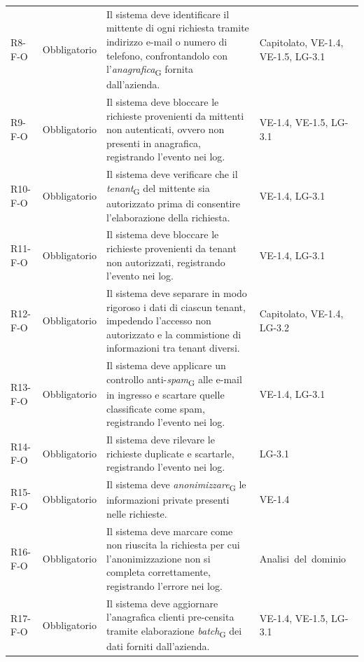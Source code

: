 {\begin{longtable}{|>{\raggedright\arraybackslash}p{1.8cm}|>{\raggedright\arraybackslash}p{2.3cm}|>{\raggedright\arraybackslash}p{6.6cm}|>{\raggedright\arraybackslash}p{3.1cm}|}
    \multicolumn{4}{|l|}{\cellcolor[gray]{0.94}\textbf{Macroarea 2 --- Filtro di sicurezza in ingresso}} \\ \hline
    \mbox{R8-F-O} & Obbligatorio & Il sistema deve identificare il mittente di ogni richiesta tramite indirizzo e-mail o numero di telefono, confrontandolo con l'\textit{anagrafica}\textsubscript{G} fornita dall'azienda. & \mbox{Capitolato}, \mbox{VE-1.4}, \mbox{VE-1.5}, \mbox{LG-3.1} \\ \hline
    \mbox{R9-F-O} & Obbligatorio & Il sistema deve bloccare le richieste provenienti da mittenti non autenticati, ovvero non presenti in anagrafica, registrando l'evento nei log. & \mbox{VE-1.4}, \mbox{VE-1.5}, \mbox{LG-3.1} \\ \hline
    \mbox{R10-F-O} & Obbligatorio & Il sistema deve verificare che il \textit{tenant}\textsubscript{G} del mittente sia autorizzato prima di consentire l'elaborazione della richiesta. & \mbox{VE-1.4}, \mbox{LG-3.1} \\ \hline
    \mbox{R11-F-O} & Obbligatorio & Il sistema deve bloccare le richieste provenienti da tenant non autorizzati, registrando l'evento nei log. & \mbox{VE-1.4}, \mbox{LG-3.1} \\ \hline
    \mbox{R12-F-O} & Obbligatorio & Il sistema deve separare in modo rigoroso i dati di ciascun tenant, impedendo l'accesso non autorizzato e la commistione di informazioni tra tenant diversi. & \mbox{Capitolato}, \mbox{VE-1.4}, \mbox{LG-3.2} \\ \hline
    \mbox{R13-F-O} & Obbligatorio & Il sistema deve applicare un controllo anti-\textit{spam}\textsubscript{G} alle e-mail in ingresso e scartare quelle classificate come spam, registrando l'evento nei log. & \mbox{VE-1.4}, \mbox{LG-3.1} \\ \hline
    \mbox{R14-F-O} & Obbligatorio & Il sistema deve rilevare le richieste duplicate e scartarle, registrando l'evento nei log. & \mbox{LG-3.1} \\ \hline
    \mbox{R15-F-O} & Obbligatorio & Il sistema deve \textit{anonimizzare}\textsubscript{G} le informazioni private presenti nelle richieste. & \mbox{VE-1.4} \\ \hline
    \mbox{R16-F-O} & Obbligatorio & Il sistema deve marcare come non riuscita la richiesta per cui l'anonimizzazione non si completa correttamente, registrando l'errore nei log. & \mbox{Analisi del dominio} \\ \hline
    \mbox{R17-F-O} & Obbligatorio & Il sistema deve aggiornare l'anagrafica clienti pre-censita tramite elaborazione \textit{batch}\textsubscript{G} dei dati forniti dall'azienda. & \mbox{VE-1.4}, \mbox{VE-1.5}, \mbox{LG-3.1} \\ \hline

\end{longtable}}
